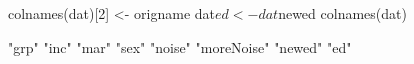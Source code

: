 \begin{Schunk}
\begin{Sinput}
  colnames(dat)[2] <- origname
  dat$ed <- dat$newed
  colnames(dat)
\end{Sinput}
\begin{Soutput}
[1] "grp"       "inc"       "mar"       "sex"       "noise"     "moreNoise" "newed"     "ed"       
\end{Soutput}
\end{Schunk}
